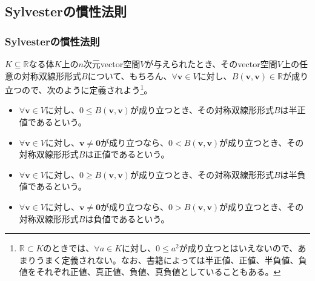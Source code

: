 \documentclass[dvipdfmx]{jsarticle}
\begin{document}
\subsection{Sylvesterの慣性法則}%
\subsubsection{Sylvesterの慣性法則}%
\begin{dfn}
$K \subseteq \mathbb{R}$なる体$K$上の$n$次元vector空間$V$が与えられたとき、そのvector空間$V$上の任意の対称双線形形式$B$について、もちろん、$\forall\mathbf{v} \in V$に対し、$B\left( \mathbf{v},\mathbf{v} \right) \in \mathbb{R}$が成り立つので、次のように定義されよう\footnote{$\mathbb{R} \subset K$のときでは、$\forall a \in K$に対し、$0 \leq a^{2}$が成り立つとはいえないので、あまりうまく定義されない。なお、書籍によっては半正値、正値、半負値、負値をそれぞれ正値、真正値、負値、真負値としていることもある。}。
\begin{itemize}
\item
  $\forall\mathbf{v} \in V$に対し、$0 \leq B\left( \mathbf{v},\mathbf{v} \right)$が成り立つとき、その対称双線形形式$B$は半正値であるという。
\item
  $\forall\mathbf{v} \in V$に対し、$\mathbf{v} \neq \mathbf{0}$が成り立つなら、$0 < B\left( \mathbf{v},\mathbf{v} \right)$が成り立つとき、その対称双線形形式$B$は正値であるという。
\item
  $\forall\mathbf{v} \in V$に対し、$0 \geq B\left( \mathbf{v},\mathbf{v} \right)$が成り立つとき、その対称双線形形式$B$は半負値であるという。
\item
  $\forall\mathbf{v} \in V$に対し、$\mathbf{v} \neq \mathbf{0}$が成り立つなら、$0 > B\left( \mathbf{v},\mathbf{v} \right)$が成り立つとき、その対称双線形形式$B$は負値であるという。
\end{itemize}
\end{dfn}
\end{document}

